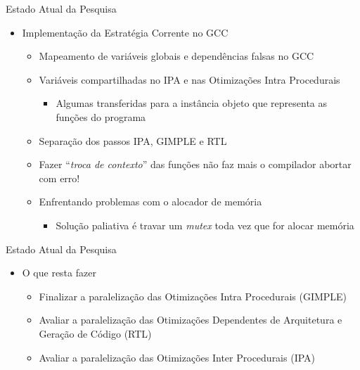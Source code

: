 \begin{frame}{Estado Atual da Pesquisa}
    \begin{itemize}
        \item Implementação da Estratégia Corrente no GCC
            \begin{itemize}
                \item Mapeamento de variáveis globais e dependências falsas no GCC
                \item Variáveis compartilhadas no IPA e nas Otimizações Intra Procedurais
                \begin{itemize}
                    \item Algumas transferidas para a instância objeto que representa as funções do programa
                \end{itemize}
                \item Separação dos passos IPA, GIMPLE e RTL
                \item Fazer ``\textit{troca de contexto}'' das funções não faz mais o compilador abortar com erro!
                \item Enfrentando problemas com o alocador de memória
                \begin{itemize}
                    \item Solução paliativa é travar um \textit{mutex} toda vez que for alocar memória
                \end{itemize}
    \end{itemize}
\end{itemize}
\end{frame}

\begin{frame}{Estado Atual da Pesquisa}
    \begin{itemize}
        \item O que resta fazer
            \begin{itemize}
                \item Finalizar a paralelização das Otimizações Intra Procedurais (GIMPLE)
                \item Avaliar a paralelização das Otimizações Dependentes de Arquitetura e Geração de Código (RTL)
                \item Avaliar a paralelização das Otimizações Inter Procedurais (IPA)
            \end{itemize}
    \end{itemize}
\end{frame}

